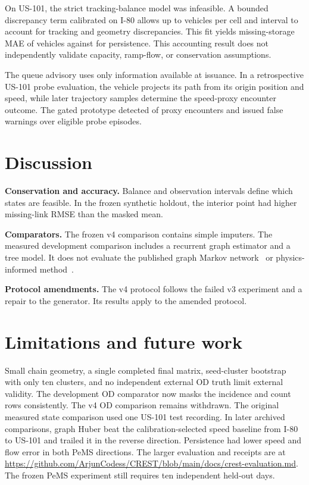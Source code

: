\documentclass{article}
\begin{document}
\begin{table}[t]
  \centering
  \caption{Mean absolute error on masked US-101 cells in the cross-site development test.}
  \label{tab:development-state}
  \CrestPilotTable
\end{table}

On US-101, the strict tracking-balance model was infeasible. A bounded discrepancy term calibrated on
I-80 allows up to \CrestPilotDiscrepancy{} vehicles per cell and interval to account for tracking
and geometry discrepancies. This fit yields missing-storage MAE of \CrestPilotStorage{} vehicles
against \CrestPilotStorageBase{} for persistence. This accounting result does not independently
validate capacity, ramp-flow, or conservation assumptions.

The queue advisory uses only information available at issuance. In a retrospective US-101 probe
evaluation, the vehicle projects its path from its origin position and speed, while later trajectory
samples determine the speed-proxy encounter outcome. The gated prototype detected \CrestPilotQueueHits{}
of \CrestPilotQueueN{} proxy encounters and issued \CrestPilotQueueFalse{} false warnings
over \CrestPilotTrips{} eligible probe episodes.

\section{Discussion}
\textbf{Conservation and accuracy.} Balance and observation intervals define which states are
feasible. In the frozen synthetic holdout, the interior point had higher missing-link RMSE
than the masked mean.

\textbf{Comparators.} The frozen v4 comparison contains simple imputers. The measured development
comparison includes a recurrent graph estimator and a tree model. It does not evaluate the published
graph Markov network~\cite{pu2020gmnn} or physics-informed method~\cite{shi2021pidl}.

\textbf{Protocol amendments.} The v4 protocol follows the failed v3 experiment and a repair to
the generator. Its results apply to the amended protocol.

\section{Limitations and future work}
Small chain geometry, a single completed final matrix, seed-cluster bootstrap with only ten clusters,
and no independent external OD truth limit external validity.
The development OD comparator now masks the incidence and count rows consistently. The v4 OD
comparison remains withdrawn. The original measured state comparison used one US-101 test
recording. In later archived comparisons, graph Huber beat the calibration-selected speed
baseline from I-80 to US-101 and trailed it in the reverse direction. Persistence had lower
speed and flow error in both PeMS directions. The larger evaluation and receipts are at
\url{https://github.com/ArjunCodess/CREST/blob/main/docs/crest-evaluation.md}.
The frozen PeMS experiment still requires ten independent held-out days.
\end{document}
